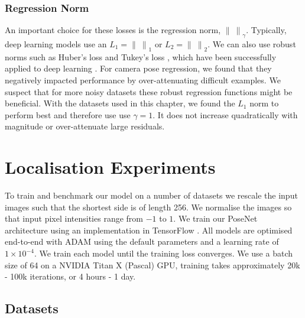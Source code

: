 \subsubsection{Regression Norm}
\label{sec:norm}

An important choice for these losses is the regression norm, $\left\lVert~\right\rVert_\gamma$. Typically, deep learning models use an $L_1 = \left\lVert~\right\rVert_1$ or $L_2 = \left\lVert~\right\rVert_2$. We can also use robust norms such as Huber's loss \citep{huber2011robust} and Tukey's loss \citep{hoaglin1983understanding}, which have been successfully applied to deep learning \citep{belagiannis2015robust}. For camera pose regression, we found that they negatively impacted performance by over-attenuating difficult examples. We suspect that for more noisy datasets these robust regression functions might be beneficial. With the datasets used in this chapter, we found the $L_1$ norm to perform best and therefore use use $\gamma=1$. It does not increase quadratically with magnitude or over-attenuate large residuals.

\section{Localisation Experiments}
\label{sec:exp}

To train and benchmark our model on a number of datasets we rescale the input images such that the shortest side is of length 256. We normalise the images so that input pixel intensities range from $-1$ to $1$. We train our PoseNet architecture using an implementation in TensorFlow \citep{abadi2016tensorflow}. All models are optimised end-to-end with ADAM \citep{kingma2014adam} using the default parameters and a learning rate of $1 \times 10^{-4}$. We train each model until the training loss converges. We use a batch size of 64 on a NVIDIA Titan X (Pascal) GPU, training takes approximately 20k - 100k iterations, or 4 hours - 1 day.

\subsection{Datasets}
\label{sec:data}

